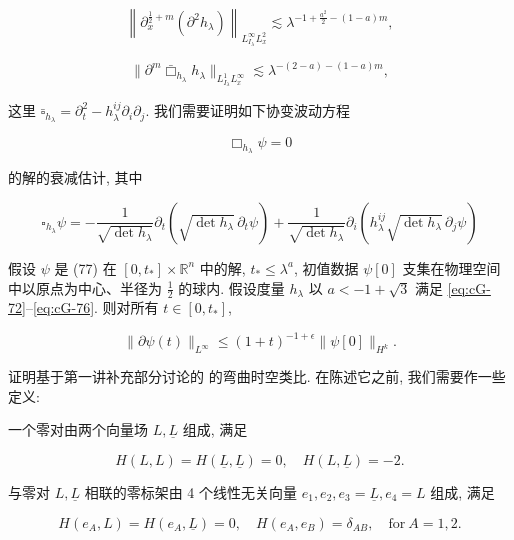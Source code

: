 \begin{equation}
\left\| \partial_ {x} ^ {\frac {1}{2} + m} \left(\partial^ {2} h _ {\lambda}\right) \right\| _ {L _ {I _ {\lambda}} ^ {\infty} L _ {x} ^ {2}} \lesssim \lambda^ {- 1 + \frac {a ^ {2}}{2} - (1 - a) m}, \label{eq:cG-75}
\end{equation}

\begin{equation}
\| \partial^ {m} \bar {\Box} _ {h _ {\lambda}} h _ {\lambda} \| _ {L _ {I _ {\lambda}} ^ {1} L _ {x} ^ {\infty}} \lesssim \lambda^ {- (2 - a) - (1 - a) m}, \label{eq:cG-76}
\end{equation}

这里 $\bar{\square}_{h_{\lambda}} = \partial_t^2 - h_{\lambda}^{ij}\partial_i\partial_j$. 我们需要证明如下协变波动方程

\begin{equation}
\Box_ {h _ {\lambda}} \psi = 0\label{eq:cG-77}
\end{equation}

的解的衰减估计, 其中

\[
\square_{h_\lambda}\psi = -\frac{1}{\sqrt{\det h_\lambda}}\partial_t\left(\sqrt{\det h_\lambda}\, \partial_t\psi\right) + \frac{1}{\sqrt{\det h_\lambda}}\partial_i\left(h_\lambda^{ij}\sqrt{\det h_\lambda}\, \partial_j\psi\right)
\]

\begin{theorem}\label{thm:cG-3.12}
假设 $\psi$ 是 (77) 在 $[0,  t_{*}] \times \mathbb{R}^{n}$ 中的解, $t_{*}\leq\lambda^{a}$, 初值数据 $\psi[0]$ 支集在物理空间中以原点为中心、半径为 $\frac{1}{2}$ 的球内. 假设度量 $h_{\lambda}$ 以 $a < -1 + \sqrt{3}$ 满足 \eqref{eq:cG-72}--\eqref{eq:cG-76}. 则对所有 $t \in [0,  t_{*}]$, 

\begin{equation}
\| \partial \psi (t) \| _ {L ^ {\infty}} \leq (1 + t) ^ {- 1 + \epsilon} \| \psi [ 0 ] \| _ {H ^ {k}}.\label{eq:cG-78}
\end{equation}

证明基于第一讲补充部分讨论的 的弯曲时空类比. 在陈述它之前, 我们需要作一些定义:
\end{theorem}

\begin{definition}\label{def:cG-3.13}
一个零对由两个向量场 $L,  \underline{L}$ 组成, 满足

\[
H (L,  L) = H (\underline {L},  \underline {L}) = 0,  \quad H (L,  \underline {L}) = - 2.
\]

与零对 $L,  \underline{L}$ 相联的零标架由 4 个线性无关向量 $e_1,  e_2,  e_3 = \underline{L},  e_4 = L$ 组成, 满足

\[
H (e _ {A},  L) = H (e _ {A},  \underline {L}) = 0,  \quad H (e _ {A},  e _ {B}) = \delta_ {A B},  \quad \mathrm{for} \ A = 1,  2.
\]
\end{definition}

